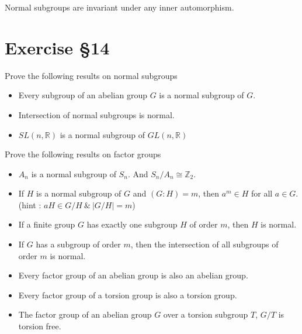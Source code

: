 \begin{remark}
	Normal subgroups are invariant under any inner automorphism.
\end{remark}
\pagebreak

\section{Exercise \S14}

\begin{remark}Prove the following results on normal subgroups
	\begin{itemize}
		\item Every subgroup of an abelian group $G$ is a normal subgroup of $G$. %
		\item Intersection of normal subgroups is normal. %
		\item $SL(n,\mathbb{R})$ is a normal subgroup of $GL(n,\mathbb{R})$%
	\end{itemize}
\end{remark}

\begin{remark}Prove the following results on factor groups
	\begin{itemize}
		\item $A_n$ is a normal subgroup of $S_n$. And $S_n/A_n \cong \mathbb{Z}_2$.%
		\item If $H$ is a normal subgroup of $G$ and $(G:H) = m$, then $a^m \in H$ for all $a \in G$.%
			(hint : $aH \in G/H\ \&\ |G/H| = m$)
		\item If a finite group $G$ has exactly one subgroup $H$ of order $m$, then $H$ is normal. %
		\item If $G$ has a subgroup of order $m$, then the intersection of all subgroups of order $m$ is normal.%
		\item Every factor group of an abelian group is also an abelian group.%
		\item Every factor group of a torsion group is also a torsion group.%
		\item The factor group of an abelian group $G$ over a torsion subgroup $T$, $G/T$ is torsion free.%
	\end{itemize}
\end{remark}

